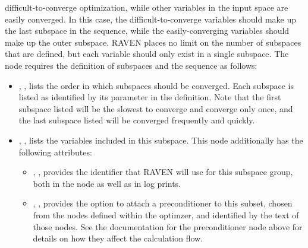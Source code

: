 \begin{itemize}
        difficult-to-converge optimization, while other variables in the input space are easily converged.  In
        this case, the difficult-to-converge variables should make up the last subspace in the sequence, while
        the easily-converging variables should make up the outer subspace.
        RAVEN places no limit on the
        number of subspaces that are defined, but each variable should only exist in a single subspace.
        The  node requires the definition of subspaces and the sequence as follows:
        \begin{itemize}
          \item {}, , lists the order in
            which subspaces should be converged.  Each subspace is listed as identified by its 
            parameter in the  definition.  Note that the first subspace listed will be the
            slowest to converge and converge only once, and the last subspace listed will be converged
            frequently and quickly.
          \item {}, , lists the variables
            included in this subspace.  This node additionally has the following attributes:
            \begin{itemize}
              \item {}, , provides the identifier that RAVEN
                will use for this subspace group, both in the  node as well as in log
                prints.
              \item {}, , provides the option to attach
                a preconditioner to this subset, chosen from the  nodes defined within
                the optimzer, and identified by the text of those nodes.  See the documentation for the
                preconditioner node above for details on how they affect the calculation flow.
            \end{itemize}
        \end{itemize}

\end{itemize}
